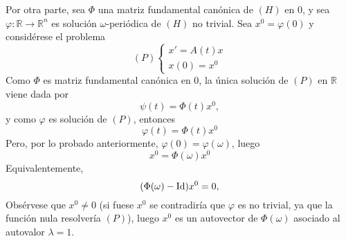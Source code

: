 \documentclass[11pt]{report}
\newcommand{\R}{\mathbb R}
\begin{document}
\begin{itemize}
\vspace{2mm}

Por otra parte, sea $\Phi$ una matriz fundamental canónica de $(H)$ en 0, y sea $\varphi \colon \R \to \R^n$ es solución $\omega$-periódica de $(H)$ no trivial. Sea $x^0=\varphi(0)$ y considérese el problema
    \[(P) \begin{cases}
        x'=A(t)x \\
        x(0)=x^0
    \end{cases}\]
    Como $\Phi$ es matriz fundamental canónica en 0, la única solución de $(P)$ en $\R$ viene dada por
    \[\psi(t)=\Phi(t)x^0,\]
    y como $\varphi$ es solución de $(P)$, entonces
    \[\varphi(t)=\Phi(t)x^0\]
    Pero, por lo probado anteriormente, $\varphi(0)=\varphi(\omega)$, luego
    \[x^0=\Phi(\omega)x^0\]
    Equivalentemente,
    \[(\Phi(\omega)-\textup{Id})x^0=0,\]
    Obsérvese que $x^0 \neq 0$ (si fuese $x^0$ se contradiría que $\varphi$ es no trivial, ya que la función nula resolvería $(P)$), luego $x^0$ es un autovector de $\Phi(\omega)$ asociado al autovalor $\lambda=1$.

    \vspace{2mm}


\end{itemize}
\end{document}
